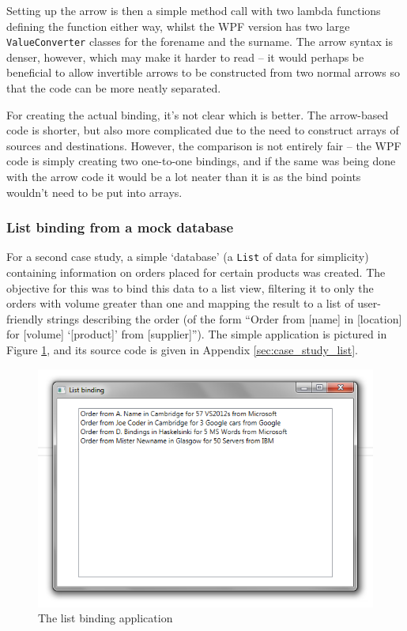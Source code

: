 \documentclass[12pt,twoside,notitlepage]{report}
\begin{document}
Setting up the arrow is then a simple method call with two lambda functions defining the function either way, whilst the WPF version has two large \texttt{ValueConverter} classes for the forename and the surname. The arrow syntax is denser, however, which may make it harder to read -- it would perhaps be beneficial to allow invertible arrows to be constructed from two normal arrows so that the code can be more neatly separated.

For creating the actual binding, it's not clear which is better. The arrow-based code is shorter, but also more complicated due to the need to construct arrays of sources and destinations. However, the comparison is not entirely fair -- the WPF code is simply creating two one-to-one bindings, and if the same was being done with the arrow code it would be a lot neater than it is as the bind points wouldn't need to be put into arrays.

\subsubsection{List binding from a mock database}

For a second case study, a simple `database' (a \texttt{List} of data for simplicity) containing information on orders placed for certain products was created. The objective for this was to bind this data to a list view, filtering it to only the orders with volume greater than one and mapping the result to a list of user-friendly strings describing the order (of the form ``Order from [name] in [location] for [volume] `[product]' from [supplier]''). The simple application is pictured in Figure \ref{fig:case_study_list}, and its source code is given in Appendix \ref{sec:case_study_list}.


\begin{figure}[!ht]
  \centering
  \includegraphics[width=\textwidth]{fig/CaseStudyListBinding.png}
  \caption{The list binding application}
  \label{fig:case_study_list}
\end{figure}
\end{document}
